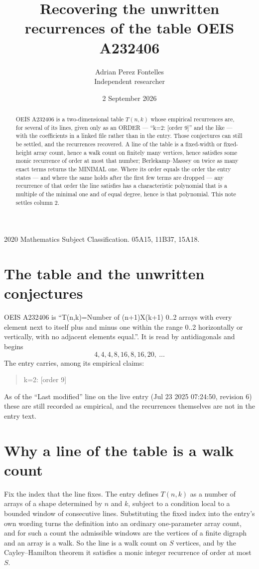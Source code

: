 \documentclass[11pt,a4paper]{article}
\title{Recovering the unwritten recurrences of the table OEIS A232406}
\author{Adrian Perez Fontelles\\ \small Independent researcher}
\date{2 September 2026}
\theoremstyle{plain}
\theoremstyle{definition}
\begin{document}
\maketitle

\begin{abstract}
OEIS A232406 is a two-dimensional table $T(n,k)$ whose empirical recurrences are, for several of
its lines, given only as an ORDER --- ``k=2: [order 9]'' and the like --- with the
coefficients in a linked file rather than in the entry. Those conjectures can still be settled,
and the recurrences recovered. A line of the table is a fixed-width or fixed-height array
count, hence a walk count on finitely many vertices, hence satisfies some monic recurrence of
order at most that number; Berlekamp--Massey on twice as many exact terms returns the MINIMAL
one. Where its order equals the order the entry states --- and where the same holds after the
first few terms are dropped --- any recurrence of that order the line satisfies has a
characteristic polynomial that is a multiple of the minimal one and of equal degree, hence is
that polynomial. This note settles column 2.
\end{abstract}

\noindent\small 2020 Mathematics Subject Classification. 05A15, 11B37, 15A18.\normalsize

\section{The table and the unwritten conjectures}

OEIS A232406 is ``T(n,k)=Number of (n+1)X(k+1) 0..2 arrays with every element next to itself plus and minus one within the range 0..2 horizontally or vertically, with no adjacent elements equal.''. It is read by antidiagonals and begins
\[
4, 4, 4, 8, 16, 8, 16, 20,\ \dots
\]
The entry carries, among its empirical claims:
\begin{quote}\small
k=2: [order 9]
\end{quote}
As of the ``Last modified'' line on the live entry (Jul 23 2025 07:24:50, revision 6) these are still
recorded as empirical, and the recurrences themselves are not in the entry text.

\section{Why a line of the table is a walk count}

Fix the index that the line fixes. The entry defines $T(n,k)$ as a number of arrays of a shape
determined by $n$ and $k$, subject to a condition local to a bounded window of consecutive
lines. Substituting the fixed index into the entry's own wording turns the definition into an
ordinary one-parameter array count, and for such a count the admissible windows are the
vertices of a finite digraph and an array is a walk. So the line is a walk count on $S$
vertices, and by the Cayley--Hamilton theorem it satisfies a monic integer recurrence of order
at most $S$.
\end{document}
